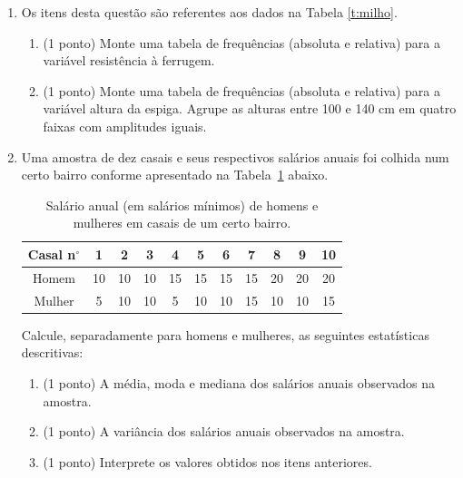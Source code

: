 \documentclass{article}
\begin{document}
\begin{enumerate}
\item Os itens desta questão são referentes aos dados na Tabela \ref{t:milho}.
\begin{enumerate}
	\item (1 ponto) Monte uma tabela de frequências  (absoluta e relativa) para a variável resistência à ferrugem.
	\item (1 ponto) Monte uma tabela de frequências (absoluta e relativa) para a variável altura da espiga. Agrupe as alturas entre 100 e 140 cm em quatro faixas com amplitudes iguais.
\end{enumerate}   


\item Uma amostra de dez casais e seus respectivos salários anuais foi colhida num certo bairro conforme apresentado na Tabela~\ref{t:salarios} abaixo.

\begin{table}[h]
	\centering
	\caption{Salário anual (em salários mínimos) de homens e mulheres em casais de um certo bairro.}
\begin{tabular}{c|cccccccccc}
	\hline
	Casal n$^\circ$ & 1 & 2 & 3 & 4 & 5 & 6 & 7 & 8 & 9 & 10 \\
	\hline        
	Homem & 10 & 10 & 10 & 15 & 15 & 15 & 15 & 20 & 20 & 20 \\
	Mulher & 5 & 10 & 10 & 5 & 10 & 10 & 15 & 10 & 10 & 15 \\
	\hline
\end{tabular}	
	\label{t:salarios}
\end{table}

Calcule, separadamente para homens e mulheres, as seguintes estatísticas descritivas:

\begin{enumerate}
	\item (1 ponto) A média, moda e mediana dos salários anuais observados na amostra.
	\item (1 ponto) A variância dos salários anuais observados na amostra.
	\item (1 ponto) Interprete os valores obtidos nos itens anteriores.
\end{enumerate}



\end{enumerate}
\end{document}
